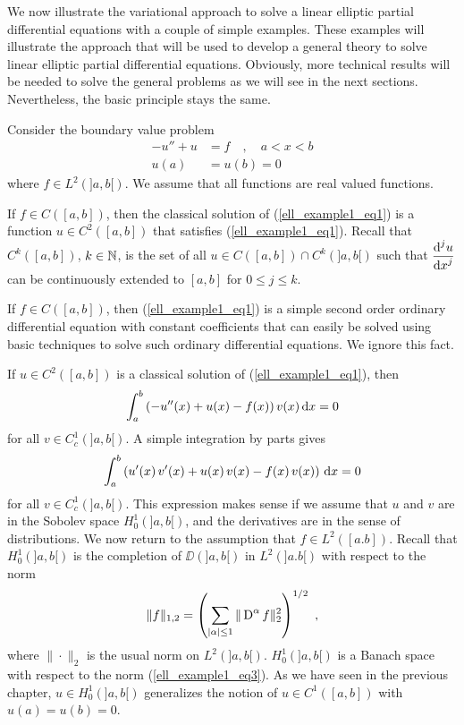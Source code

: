 We now illustrate the variational approach to solve a linear elliptic
partial differential equations with a couple of simple examples.
These examples will illustrate the approach that will be used to
develop a general theory to solve linear elliptic partial differential
equations.  Obviously, more technical results will be needed to
solve the general problems as we will see in the next sections.
Nevertheless, the basic principle stays the same. 

\begin{egg}
Consider the boundary value problem
\begin{equation} \label{ell_example1_eq1}
\begin{split}
- u'' + u &= f  \quad , \quad a < x < b \\
 u(a)&=u(b) = 0
\end{split}
\end{equation}
where $\displaystyle f \in L^2(]a,b[)$.  We assume that all functions are real
valued functions.                   \label{ell_example1}

If $f\in C([a,b])$, then the classical solution of
(\ref{ell_example1_eq1}) is a function $\displaystyle u\in C^2([a,b])$ that
satisfies (\ref{ell_example1_eq1}).  Recall that $\displaystyle C^k([a,b])$,
$k\in \mathbb{N}$, is the set of all
$\displaystyle u \in C([a,b]) \cap C^k(]a,b[)$ such
that $\displaystyle \frac{\displaystyle \mathrm{d}^{j}{u}} {\displaystyle \mathrm{d}{x}^{j}}$ can be continuously extended
to $[a,b]$ for $0 \leq j \leq k$.

If $f\in C([a,b])$, then (\ref{ell_example1_eq1}) is a simple second
order ordinary differential equation with constant coefficients that
can easily be solved using basic techniques to solve such ordinary
differential equations.  We ignore this fact.

If $\displaystyle u \in C^2([a,b])$ is a classical solution of
(\ref{ell_example1_eq1}), then
\[
\int_a^b \left( -u''(x) + u(x) - f(x) \right)v(x)\,\mathrm{d}{x} = 0
\]
for all $\displaystyle v \in C^1_c(]a,b[)$.  A simple integration by parts gives
\[
\int_a^b \left( u'(x)\,v'(x) + u(x)\, v(x) -f(x)\, v(x)
\right) \,\mathrm{d}{x} = 0
\]
for all $\displaystyle v \in C^1_c(]a,b[)$.
This expression makes sense if we assume that
$u$ and $v$ are in the Sobolev space $\displaystyle H_0^{1}(]a,b[)$, and the
derivatives are in the sense of distributions.  We now return to the
assumption that $\displaystyle f \in L^2([a.b])$.  Recall that
$\displaystyle H^1_0(]a,b[)$ is the completion of $\DD(]a,b[)$ in
$\displaystyle L^2(]a.b[)$ with respect to the norm
\begin{equation} \label{ell_example1_eq3}
\| f \|_{1,2} = \left( \sum_{|\alpha|\leq 1} \| \operatorname{D}^\alpha f \|_2^2
\right)^{1/2} \ ,
\end{equation}
where $\|\cdot\|_2$ is the usual norm on $\displaystyle L^2(]a,b[)$.
$\displaystyle H^1_0(]a,b[)$ is a Banach space with respect to the norm
(\ref{ell_example1_eq3}).  As we have seen in the previous chapter,
$\displaystyle u \in H^1_0(]a,b[)$ generalizes the notion of
$\displaystyle u\in C^1([a,b])$ with $u(a)=u(b)=0$.


\end{egg}
